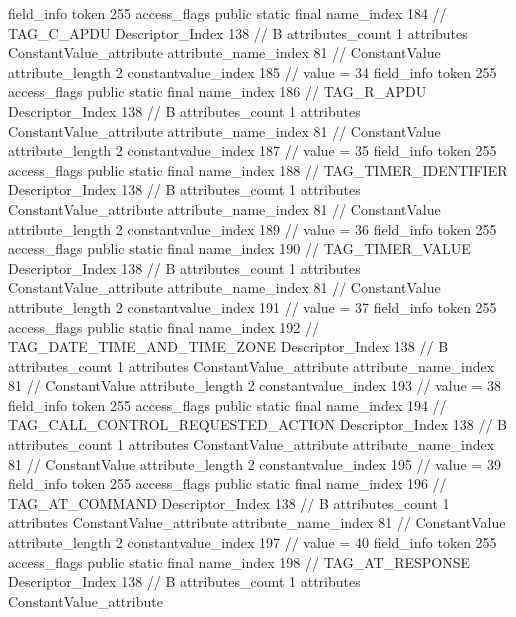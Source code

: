 {{{{{{				}
			}
			field_info {
				token	255
				access_flags	public static final
				name_index	184		// TAG_C_APDU
				Descriptor_Index	138		// B
				attributes_count	1
				attributes {
				ConstantValue_attribute {
					attribute_name_index	81		// ConstantValue
					attribute_length	2
					constantvalue_index	185		// value = 34
				}
				}
			}
			field_info {
				token	255
				access_flags	public static final
				name_index	186		// TAG_R_APDU
				Descriptor_Index	138		// B
				attributes_count	1
				attributes {
				ConstantValue_attribute {
					attribute_name_index	81		// ConstantValue
					attribute_length	2
					constantvalue_index	187		// value = 35
				}
				}
			}
			field_info {
				token	255
				access_flags	public static final
				name_index	188		// TAG_TIMER_IDENTIFIER
				Descriptor_Index	138		// B
				attributes_count	1
				attributes {
				ConstantValue_attribute {
					attribute_name_index	81		// ConstantValue
					attribute_length	2
					constantvalue_index	189		// value = 36
				}
				}
			}
			field_info {
				token	255
				access_flags	public static final
				name_index	190		// TAG_TIMER_VALUE
				Descriptor_Index	138		// B
				attributes_count	1
				attributes {
				ConstantValue_attribute {
					attribute_name_index	81		// ConstantValue
					attribute_length	2
					constantvalue_index	191		// value = 37
				}
				}
			}
			field_info {
				token	255
				access_flags	public static final
				name_index	192		// TAG_DATE_TIME_AND_TIME_ZONE
				Descriptor_Index	138		// B
				attributes_count	1
				attributes {
				ConstantValue_attribute {
					attribute_name_index	81		// ConstantValue
					attribute_length	2
					constantvalue_index	193		// value = 38
				}
				}
			}
			field_info {
				token	255
				access_flags	public static final
				name_index	194		// TAG_CALL_CONTROL_REQUESTED_ACTION
				Descriptor_Index	138		// B
				attributes_count	1
				attributes {
				ConstantValue_attribute {
					attribute_name_index	81		// ConstantValue
					attribute_length	2
					constantvalue_index	195		// value = 39
				}
				}
			}
			field_info {
				token	255
				access_flags	public static final
				name_index	196		// TAG_AT_COMMAND
				Descriptor_Index	138		// B
				attributes_count	1
				attributes {
				ConstantValue_attribute {
					attribute_name_index	81		// ConstantValue
					attribute_length	2
					constantvalue_index	197		// value = 40
				}
				}
			}
			field_info {
				token	255
				access_flags	public static final
				name_index	198		// TAG_AT_RESPONSE
				Descriptor_Index	138		// B
				attributes_count	1
				attributes {
				ConstantValue_attribute {
}}}}}}}
